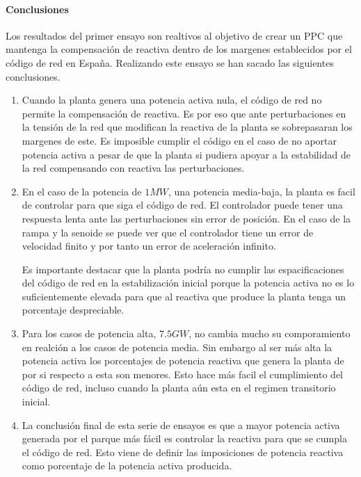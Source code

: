 \documentclass{book}
\begin{document}
	\paragraph{Conclusiones}
Los resultados del primer ensayo son realtivos al objetivo de crear un PPC que mantenga la compensaci\'on de reactiva dentro de los margenes establecidos por el c\'odigo de red en España. Realizando este ensayo se han sacado las siguientes conclusiones. \par
\begin{enumerate}[1.]

\item Cuando la planta genera una potencia activa nula, el c\'odigo de red no permite la compensaci\'on de reactiva. Es por eso que ante perturbaciones en la tensi\'on de la red que modifican la reactiva de la planta se sobrepasaran los margenes de este. Es imposible cumplir el c\'odigo en el caso de no aportar potencia activa a pesar de que la planta si pudiera apoyar a la estabilidad de la red compensando con reactiva las perturbaciones. \par

\item En el caso de la potencia de $1MW$, una potencia media-baja, la planta es facil de controlar para que siga el c\'odigo de red. El controlador puede tener una respuesta lenta ante las perturbaciones sin error de posici\'on. En el caso de la rampa y la senoide se puede ver que el controlador tiene un error de velocidad finito y por tanto un error de aceleraci\'on infinito. \par

Es importante destacar que la planta podr\'ia no cumplir las espacificaciones del c\'odigo de red en la estabilizaci\'on inicial porque la potencia activa no es lo suficientemente elevada para que al reactiva que produce la planta tenga un porcentaje despreciable. \par

\item Para los casos de potencia alta, $7.5 GW$, no cambia mucho su comporamiento en realci\'on a los casos de potencia media. Sin embargo al ser m\'as alta la potencia activa los porcentajes de potencia reactiva que genera la planta de por si respecto a esta son menores. Esto hace m\'as facil el cumplimiento del c\'odigo de red, incluso cuando la planta a\'un esta en el regimen transitorio inicial. \par

\item La conclusi\'on final de esta serie de ensayos es que a mayor potencia activa generada por el parque m\'as f\'acil es controlar la reactiva para que se cumpla el c\'odigo de red. Esto viene de definir las imposiciones de potencia reactiva como porcentaje de la potencia activa producida. \par


\end{enumerate}
\end{document}
